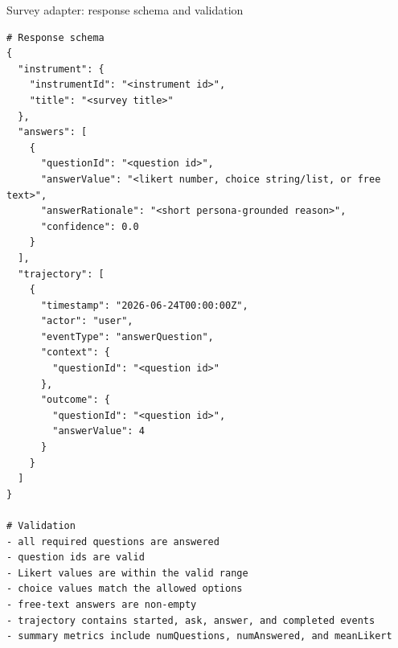 \begin{promptbox}[label={box:survey-schema}]{Survey adapter: response schema and validation}
\begin{lstlisting}
# Response schema
{
  "instrument": {
    "instrumentId": "<instrument id>",
    "title": "<survey title>"
  },
  "answers": [
    {
      "questionId": "<question id>",
      "answerValue": "<likert number, choice string/list, or free text>",
      "answerRationale": "<short persona-grounded reason>",
      "confidence": 0.0
    }
  ],
  "trajectory": [
    {
      "timestamp": "2026-06-24T00:00:00Z",
      "actor": "user",
      "eventType": "answerQuestion",
      "context": {
        "questionId": "<question id>"
      },
      "outcome": {
        "questionId": "<question id>",
        "answerValue": 4
      }
    }
  ]
}

# Validation
- all required questions are answered
- question ids are valid
- Likert values are within the valid range
- choice values match the allowed options
- free-text answers are non-empty
- trajectory contains started, ask, answer, and completed events
- summary metrics include numQuestions, numAnswered, and meanLikert
\end{lstlisting}
\end{promptbox}

